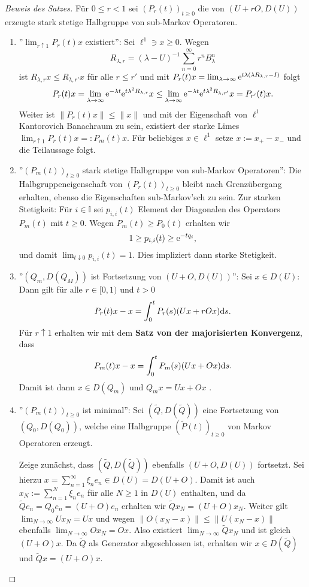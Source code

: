 \begin{proof}[Beweis des Satzes] Für $0\leq r< 1$ sei $(P_r(t))_{t\geq0}$ die von  $(U+rO, D(U))$ erzeugte stark stetige Halbgruppe von sub-Markov Operatoren.
  \begin{enumerate}
  \item ''$\lim_{r\uparrow 1}P_r(t)x$ existiert'': Sei $\ell^1\ni x\geq0$.  Wegen
    $$R_{\lambda, r}=(\lambda -U)^{-1}\sum_{n=0}^\infty r^n B_\lambda ^n$$
  ist $R_{\lambda,r}x\leq R_{\lambda, r'}x$ für alle $r\leq r'$ und mit $P_r(t)x=\lim_{\lambda\to\infty}\text e^{t\lambda(\lambda R_{\lambda,r}-I)}$ folgt 
    $$P_r(t)x=\lim_{\lambda\to\infty}\text e^{-\lambda t}\text e^{t\lambda^2 R_{\lambda, r}}x\leq\lim_{\lambda\to \infty}\text e^{-\lambda t}\text e^{t\lambda^2 R_{\lambda,r'}}x=P_{r'}(t)x.$$
  Weiter ist $\|P_r(t)x\|\leq\|x\|$   und mit der Eigenschaft von $\ell^1$ Kantorovich Banachraum zu sein,  existiert der starke Limes $\lim_{r\uparrow1}P_r(t)x=:P_m(t)x$. Für beliebiges $x\in\ell^1$ setze $x:=x_+ - x_-$ und die Teilaussage folgt.
  \item ''$(P_m(t))_{t\geq0}$ stark stetige Halbgruppe von sub-Markov Operatoren'':  Die Halbgruppeneigenschaft von $(P_r(t))_{t\geq0}$ bleibt nach Grenzübergang erhalten, ebenso die Eigenschaften sub-Markov'sch zu sein. Zur starken Stetigkeit: Für $i\in \mathbb I$ sei $p_{i,i}(t)$ Element der Diagonalen des Operators $P_m(t)$ mit $t\geq0$. Wegen $P_m(t)\geq P_0(t)$ erhalten wir $$1\geq p_{i,i}(t)\geq \text e^{-tq_i},$$ und  damit $\lim_{t\downarrow 0}p_{i,i}(t)=1$. Dies impliziert dann starke Stetigkeit.
  \item ''$(Q_m, D(Q_M))$ ist Fortsetzung von $(U+O, D(U))$'': Sei $x\in D(U)$: Dann gilt für alle $r\in[0,1)$ und $t>0$ $$P_r(t)x-x=\int_0^t P_r(s)(Ux+rOx)\text ds.$$
  Für $r\uparrow 1$ erhalten wir mit dem \textbf{Satz von der majorisierten Konvergenz}, dass
    $$P_m(t)x-x=\int_0^t P_m(s)(Ux+Ox)\text ds.$$
  Damit ist dann $x\in D(Q_m)$ und $Q_mx=Ux+Ox$ .
  \item ''$(P_m(t))_{t\geq0}$ ist minimal'': Sei $(\tilde Q, D(\tilde Q))$ eine  Fortsetzung von $(Q_0, D(Q_0))$, welche eine Halbgruppe $(\tilde P(t))_{t\geq0}$ von Markov Operatoren erzeugt. \\ 
  \par Zeige zunächst, dass $(\tilde Q, D(\tilde Q))$ ebenfalls $(U+O, D(U))$ fortsetzt. Sei hierzu $x=\sum_{n=1}^\infty \xi_n e_n \in D(U)=D(U+O)$. Damit ist auch $x_N:=\sum_{n=1}^N \xi_n e_n$ für alle $N\geq1$ in $D(U)$ enthalten, und da $\tilde Q e_n=Q_0e_n=(U+O)e_n$ erhalten wir $\tilde Q x_N=(U+O)x_N$. Weiter gilt $\lim_{N\to\infty}Ux_N =Ux$ und wegen $\|O(x_N-x)\|\leq \|U(x_N-x)\|$ ebenfalls $\lim_{N\to\infty}O x_N=Ox$. Also existiert $\lim_{N\to\infty}\tilde Q x_N$ und ist gleich $(U+O)x$. Da $\tilde Q$ als Generator abgeschlossen ist, erhalten wir $x\in D(\tilde Q)$ und $\tilde Qx=(U+O)x$.\\

\end{enumerate}
\end{proof}
